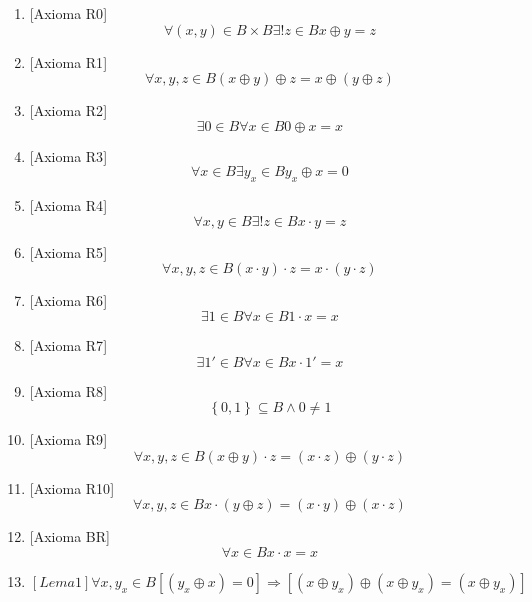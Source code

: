 \begin{enumerate}
\begin{enumerate}
\begin{enumerate}
      \begin{enumerate}
      \def\labelenumiv{\arabic{enumiv}.}
      \item
        {[}Axioma R0{]}
        \[\forall{\left( {x,y} \right) \in {B \times B}}\exists\mathtt{\mathrm{!}}{z \in B}x \oplus {y = z}\]
      \item
        {[}Axioma R1{]}
        \[\forall x,y,{z \in B}\left( {x \oplus y} \right) \oplus {z = x} \oplus \left( {y \oplus z} \right)\]
      \item
        {[}Axioma R2{]}
        \[\exists{0 \in B}\forall{x \in B}0 \oplus {x = x}\]
      \item
        {[}Axioma R3{]}
        \[\forall{x \in B}\exists{y_{x} \in B}y_{x} \oplus {x = 0}\]
      \item
        {[}Axioma R4{]}
        \[\forall x,{y \in B}\exists\mathtt{\mathrm{!}}{z \in B}{{x \cdot y} = z}\]
      \item
        {[}Axioma R5{]}
        \[\forall x,y,{z \in B}{{\left( {x \cdot y} \right) \cdot z} = {x \cdot \left( {y \cdot z} \right)}}\]
      \item
        {[}Axioma R6{]}
        \[\exists{1 \in B}\forall{x \in B}{{1 \cdot x} = x}\]
      \item
        {[}Axioma R7{]}
        \[\exists 1{' \in B}\forall{x \in B}{x \cdot 1}{' = x}\]
      \item
        {[}Axioma R8{]}
        \[{\left\{ 0,1 \right\} \subseteq {B \land 0}} \neq 1\]
      \item
        {[}Axioma R9{]}
        \[\forall x,y,{z \in B}{{\left( {x \oplus y} \right) \cdot z} = \left( {x \cdot z} \right)} \oplus \left( {y \cdot z} \right)\]
      \item
        {[}Axioma
        R10{]}\[\forall x,y,{z \in B}{{x \cdot \left( {y \oplus z} \right)} = \left( {x \cdot y} \right)} \oplus \left( {x \cdot z} \right)\]
      \item
        {[}Axioma BR{]}\[\forall{x \in B}{{x \cdot x} = x}\]
      \item
        \[\left\lbrack {{Lema}1} \right\rbrack\forall x,{y_{x} \in B}\left\lbrack {\left( {y_{x} \oplus x} \right) = 0} \right\rbrack\Rightarrow\left\lbrack {\left( {x \oplus y_{x}} \right) \oplus {\left( {x \oplus y_{x}} \right) = \left( {x \oplus y_{x}} \right)}} \right\rbrack\]


\end{enumerate}
\end{enumerate}
\end{enumerate}
\end{enumerate}
